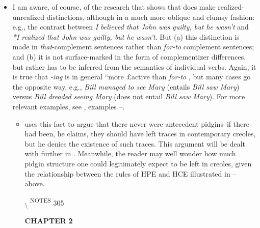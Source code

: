 \begin{itemize}
\begin{itemize}
\begin{itemize}
\item I am aware, of course, of the research that shows that  does make realized-unrealized distinctions, although in a much more oblique and clumsy fashion: e.g., the contrast between \textit{I believed that John was guilty, but he wasn't} and \textit{*I realized that John was guilty,  but he wasn't}. But (a) this distinction is made in \textit{that}-complement sentences rather than \textit{for-to} complement sentences; and (b) it is not surface-marked in the form of complementizer differences, but rather has to be inferred from the semantics of individual verbs. Again, it is true that \textit{-ing}  is in general ``more £active than \textit{for-to} , but many cases go the opposite way, e.g., \textit{Bill managed to see Mary} (entails \textit{Bill saw Mary}) versus \textit{Bill dreaded seeing Mary} (does not entail \textit{Bill saw Mary}). For more relevant exam\-ples, see , examples --.

\begin{itemize}
\item \citet{Alleyne1979} uses this fact to argue that there never were antecedent pidgins--if there had been, he claims, they should have left traces in contemporary creoles, but he denies the existence of such traces. This argument will be dealt with further in . Meanwhile, the reader may well wonder how much pidgin structure one could legitimately expect to be left in creoles, given the relation\-ship between the rules of HPE and HCE illustrated in -- above.

\textsubscript{{\textbackslash} }\textsuperscript{NOTES} 305

\textbf{CHAPTER} \textbf{2}


\end{itemize}
\end{itemize}
\end{itemize}
\end{itemize}
